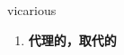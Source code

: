 
\begin{frame}
{\huge vicarious}
\begin{center}
\begin{enumerate}\Large
  \item \textbf{代理的，取代的}
\end{enumerate}
\end{center}
\end{frame}
